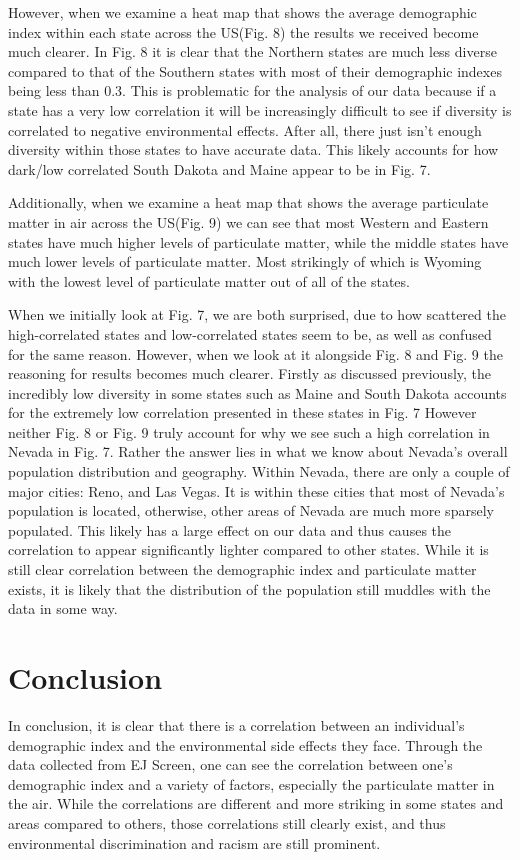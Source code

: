\documentclass[letterpaper, 10 pt, conference]{ieeeconf}  %
\begin{document}
However, when we examine a heat map that shows the average demographic index within each state across the US(Fig. 8) the results we received become much clearer. In Fig. 8 it is clear that the Northern states are much less diverse compared to that of the Southern states with most of their demographic indexes being less than 0.3. This is problematic for the analysis of our data because if a state has a very low correlation it will be increasingly difficult to see if diversity is correlated to negative environmental effects. After all, there just isn't enough diversity within those states to have accurate data. This likely accounts for how dark/low correlated South Dakota and Maine appear to be in Fig. 7. \par
Additionally, when we examine a heat map that shows the average particulate matter in air across the US(Fig. 9) we can see that most Western and Eastern states have much higher levels of particulate matter, while the middle states have much lower levels of particulate matter. Most strikingly of which is Wyoming with the lowest level of particulate matter out of all of the states.\par
When we initially look at Fig. 7, we are both surprised, due to how scattered the high-correlated states and low-correlated states seem to be, as well as confused for the same reason. However, when we look at it alongside Fig. 8 and Fig. 9 the reasoning for results becomes much clearer. Firstly as discussed previously, the incredibly low diversity in some states such as Maine and South Dakota accounts for the extremely low correlation presented in these states in Fig. 7 However neither Fig. 8 or Fig. 9  truly account for why we see such a high correlation in Nevada in Fig. 7. Rather the answer lies in what we know about Nevada's overall population distribution and geography. Within Nevada, there are only a couple of major cities: Reno, and Las Vegas. It is within these cities that most of Nevada's population is located, otherwise, other areas of Nevada are much more sparsely populated. This likely has a large effect on our data and thus causes the correlation to appear significantly lighter compared to other states. While it is still clear correlation between the demographic index and particulate matter exists, it is likely that the distribution of the population still muddles with the data in some way.\par



\section{Conclusion}
In conclusion, it is clear that there is a correlation between an individual's demographic index and the environmental side effects they face. Through the data collected from EJ Screen, one can see the correlation between one's demographic index and a variety of factors, especially the particulate matter in the air. While the correlations are different and more striking in some states and areas compared to others, those correlations still clearly exist, and thus environmental discrimination and racism are still prominent. \par
\end{document}
